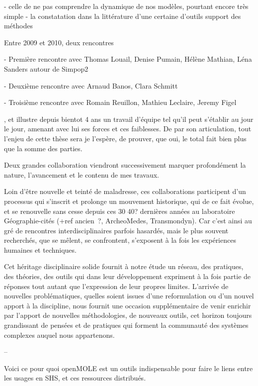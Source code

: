   - celle de ne pas comprendre la dynamique de nos modèles, pourtant encore très simple
  - la constatation dans la littérature d'une certaine d'outils support des méthodes




Entre 2009 et 2010, deux rencontres

- Première rencontre avec Thomas Louail, Denise Pumain, Hélène Mathian, Léna Sanders autour de Simpop2

- Deuxième rencontre avec Arnaud Banos, Clara Schmitt

- Troisième rencontre avec Romain Reuillon, Mathieu Leclaire, Jeremy Figel


 ,  et illustre depuis bientot 4 ans un travail d'équipe tel qu'il peut s'établir au jour le jour, amenant avec lui ses forces et ces faiblesses. De par son articulation, tout l'enjeu de cette thèse sera je l'espère, de prouver, que oui, le total fait bien plus que la somme des parties.

Deux grandes collaboration viendront successivement marquer profondément la nature, l'avancement et le contenu de mes travaux.


Loin d'être nouvelle et teinté de maladresse, ces collaborations participent d'un processus qui s'inscrit et prolonge un mouvement historique, qui de ce fait évolue, et se renouvelle sans cesse depuis ces 30 40? dernières années au laboratoire Géographie-cités (+ref ancien ?, ArcheoMedes, Transmondyn). Car c'est ainsi  au gré de rencontres interdisciplinaires parfois hasardés, mais le plus souvent recherchés, que se mêlent, se confrontent, s'exposent à la fois les expériences humaines et techniques.

Cet héritage disciplinaire solide fournit à notre étude un réseau, des pratiques, des théories, des outils  qui dans leur développement expriment à la fois partie de réponses tout autant que l'expression de leur propres limites. L'arrivée de nouvelles problématiques, quelles soient issues d'une reformulation ou d'un nouvel apport à la discipline, nous fournit une occasion supplémentaire de venir enrichir par l'apport de nouvelles méthodologies, de nouveaux outils, cet horizon toujours grandissant de pensées et de pratiques qui forment la communauté des systèmes complexes auquel nous appartenons.




--

Voici ce pour quoi openMOLE est un outils indispensable pour faire le liens entre les usages en SHS, et ces ressources distribués.

